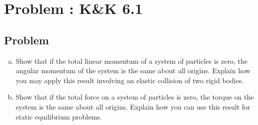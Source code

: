 \documentclass[solutions]{esg8012pset}
\date{\today }
\begin{document}
\section{Problem \thesection: K\&K 6.1}
\subsection{Problem}
  \begin{enumerate}[(a)]
    \item Show that if the total linear momentum of a system of particles is zero, the angular momentum of the system is the same about all origins. Explain how you may apply this result involving an elastic collision of two rigid bodies.
    \item Show that if the total force on a system of particles is zero, the torque on the system is the same about all origins. Explain how you can use this result for static equilibrium problems.
  \end{enumerate}
\end{document}
